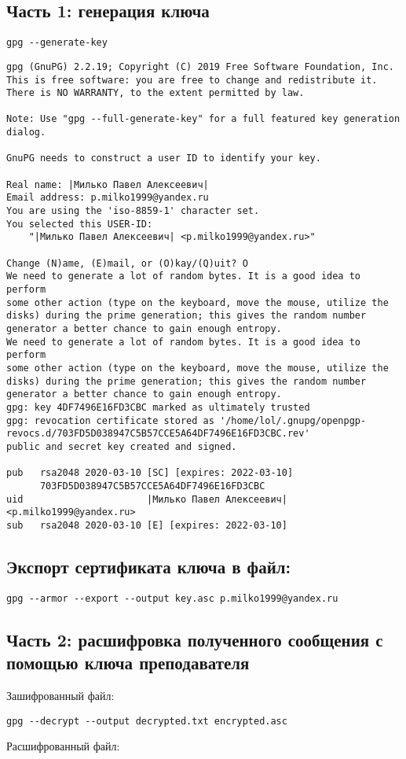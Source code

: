 \documentclass[12pt]{article}
\newcommand{\pa}[1]{\subsection*{\bf #1}}
\newcommand{\printPlain}[1]{\smallbreak{\large \bf  #1}
	{\scriptsize
		\setlength{\parindent}{0pt}
		
	}
}
\begin{document}
\pa{Часть 1: генерация ключа}

\lstinline|gpg --generate-key|

{\scriptsize
\begin{lstlisting}[escapechar=|,breaklines=true]
gpg (GnuPG) 2.2.19; Copyright (C) 2019 Free Software Foundation, Inc.
This is free software: you are free to change and redistribute it.
There is NO WARRANTY, to the extent permitted by law.

Note: Use "gpg --full-generate-key" for a full featured key generation dialog.

GnuPG needs to construct a user ID to identify your key.

Real name: |Милько Павел Алексеевич|
Email address: p.milko1999@yandex.ru
You are using the 'iso-8859-1' character set.
You selected this USER-ID:
    "|Милько Павел Алексеевич| <p.milko1999@yandex.ru>"

Change (N)ame, (E)mail, or (O)kay/(Q)uit? O
We need to generate a lot of random bytes. It is a good idea to perform
some other action (type on the keyboard, move the mouse, utilize the
disks) during the prime generation; this gives the random number
generator a better chance to gain enough entropy.
We need to generate a lot of random bytes. It is a good idea to perform
some other action (type on the keyboard, move the mouse, utilize the
disks) during the prime generation; this gives the random number
generator a better chance to gain enough entropy.
gpg: key 4DF7496E16FD3CBC marked as ultimately trusted
gpg: revocation certificate stored as '/home/lol/.gnupg/openpgp-revocs.d/703FD5D038947C5B57CCE5A64DF7496E16FD3CBC.rev'
public and secret key created and signed.

pub   rsa2048 2020-03-10 [SC] [expires: 2022-03-10]
      703FD5D038947C5B57CCE5A64DF7496E16FD3CBC
uid                      |Милько Павел Алексеевич| <p.milko1999@yandex.ru>
sub   rsa2048 2020-03-10 [E] [expires: 2022-03-10]
\end{lstlisting}
}

\pa{Экспорт сертификата ключа в файл:}
\lstinline|gpg --armor --export --output key.asc p.milko1999@yandex.ru|
\printPlain{key.asc}

\pa{Часть 2: расшифровка полученного сообщения с помощью ключа преподавателя}
Зашифрованный файл:

\printPlain{t3/encrypted.asc}

\noindent \lstinline|gpg --decrypt --output decrypted.txt encrypted.asc|
\smallbreak

\noindent Расшифрованный файл:
\end{document}
